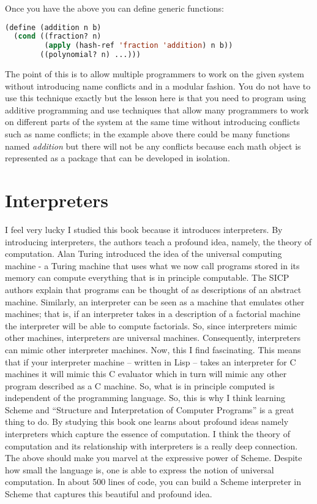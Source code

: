 \documentclass{amsbook}
\begin{document}
Once you have the above you can define generic functions:

\begin{lstlisting}[language=Lisp]
(define (addition n b)
  (cond ((fraction? n) 
         (apply (hash-ref 'fraction 'addition) n b))
        ((polynomial? n) ...)))
 \end{lstlisting}
 
The point of this is to allow multiple programmers to work on the given system without introducing name conflicts and in a modular fashion. You do not have to use this technique exactly but the lesson here is that you need to program using additive programming and use techniques that allow many programmers to work on different parts of the system at the same time without introducing conflicts such as name conflicts; in the example above there could be many functions named \textit{addition} but there will not be any conflicts because each math object is represented as a package that can be developed in isolation.
 
\section{Interpreters}

I feel very lucky I studied this book because it introduces interpreters. By introducing interpreters, the authors teach a profound idea, namely, the theory of computation. Alan Turing introduced the idea of the universal computing machine - a Turing machine that uses what we now call programs stored in its memory can compute everything that is in principle computable. The SICP authors explain that programs can be thought of as descriptions of an abstract machine. Similarly, an interpreter can be seen as a machine that emulates other machines; that is, if an interpreter takes in a description of a factorial machine the interpreter will be able to compute factorials. So, since interpreters mimic other machines, interpreters are universal machines. Consequently, interpreters can mimic other interpreter machines. Now, this I find fascinating. This means that if your interpreter machine – written in Lisp – takes an interpreter for C machines it will mimic this C evaluator which in turn will mimic any other program described as a C machine. So, what is in principle computed is independent of the programming language. So, this is why I think learning Scheme and “Structure and Interpretation of Computer Programs” is a great thing to do. By studying this book one learns about profound ideas namely interpreters which capture the essence of computation. I think the theory of computation and its relationship with interpreters is a really deep connection. The above should make you marvel at the expressive power of Scheme. Despite how small the language is, one is able to express the notion of universal computation. In about 500 lines of code, you can build a Scheme interpreter in Scheme that captures this beautiful and profound idea. 
\end{document}
